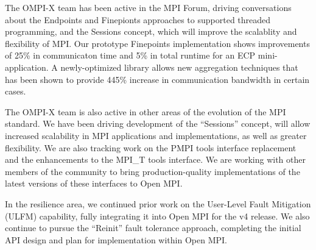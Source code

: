 
The OMPI-X team has been active in the MPI Forum, driving
conversations about the Endpoints and Finepionts approaches to
supported threaded programming, and the Sessions concept, which will
improve the scalablity and flexibility of MPI.  Our prototype
Finepoints implementation shows improvements of 25\% in communicaton
time and 5\% in total runtime for an ECP mini-application.  A
newly-optimized library allows new aggregation techniques that has
been shown to provide 445\% increase in communication bandwidth in
certain cases.

The OMPI-X team is also active in other areas of the evolution of the
MPI standard. We have been driving development of the ``Sessions''
concept, will allow increased scalability in MPI applications and
implementations, as well as greater flexibility.
%
We are also tracking work on the PMPI tools interface replacement and
the enhancements to the MPI\_T tools interface.  We are working with
other members of the community to bring production-quality
implementations of the latest versions of these interfaces to Open
MPI.

In the resilience area, we continued prior work on the User-Level
Fault Mitigation (ULFM) capability, fully integrating it into Open MPI
for the v4 release.  We also continue to pursue the ``Reinit'' fault
tolerance approach, completing the initial API design and plan for
implementation within Open MPI.

